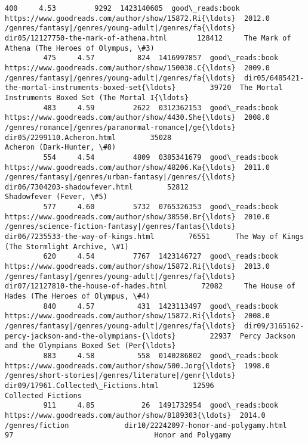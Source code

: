 \documentclass[11pt]{article}
\begin{document}
\begin{Verbatim}[commandchars=\\\{\}]
         400     4.53         9292  1423140605  good\_reads:book  https://www.goodreads.com/author/show/15872.Ri{\ldots}  2012.0  /genres/fantasy|/genres/young-adult|/genres/fa{\ldots}             dir05/12127750-the-mark-of-athena.html       128412     The Mark of Athena (The Heroes of Olympus, \#3)
         475     4.57          824  1416997857  good\_reads:book  https://www.goodreads.com/author/show/150038.C{\ldots}  2009.0  /genres/fantasy|/genres/young-adult|/genres/fa{\ldots}  dir05/6485421-the-mortal-instruments-boxed-set{\ldots}        39720  The Mortal Instruments Boxed Set (The Mortal I{\ldots}
         483     4.59         2622  0312362153  good\_reads:book  https://www.goodreads.com/author/show/4430.She{\ldots}  2008.0  /genres/romance|/genres/paranormal-romance|/ge{\ldots}                         dir05/2299110.Acheron.html        35028                          Acheron (Dark-Hunter, \#8)
         554     4.54         4809  0385341679  good\_reads:book  https://www.goodreads.com/author/show/48206.Ka{\ldots}  2011.0  /genres/fantasy|/genres/urban-fantasy|/genres/{\ldots}                     dir06/7304203-shadowfever.html        52812                            Shadowfever (Fever, \#5)
         577     4.60         5732  0765326353  good\_reads:book  https://www.goodreads.com/author/show/38550.Br{\ldots}  2010.0  /genres/science-fiction-fantasy|/genres/fantas{\ldots}                dir06/7235533-the-way-of-kings.html        76551      The Way of Kings (The Stormlight Archive, \#1)
         620     4.54         7767  1423146727  good\_reads:book  https://www.goodreads.com/author/show/15872.Ri{\ldots}  2013.0  /genres/fantasy|/genres/young-adult|/genres/fa{\ldots}             dir07/12127810-the-house-of-hades.html        72082     The House of Hades (The Heroes of Olympus, \#4)
         840     4.57          431  1423113497  good\_reads:book  https://www.goodreads.com/author/show/15872.Ri{\ldots}  2008.0  /genres/fantasy|/genres/young-adult|/genres/fa{\ldots}  dir09/3165162-percy-jackson-and-the-olympians-{\ldots}        22937  Percy Jackson and the Olympians Boxed Set (Per{\ldots}
         883     4.58          558  0140286802  good\_reads:book  https://www.goodreads.com/author/show/500.Jorg{\ldots}  1998.0  /genres/short-stories|/genres/literature|/genr{\ldots}                dir09/17961.Collected\_Fictions.html        12596                                 Collected Fictions
         911     4.85           26  1491732954  good\_reads:book  https://www.goodreads.com/author/show/8189303{\ldots}  2014.0                                    /genres/fiction             dir10/22242097-honor-and-polygamy.html           97                                 Honor and Polygamy

\end{Verbatim}
\end{document}
